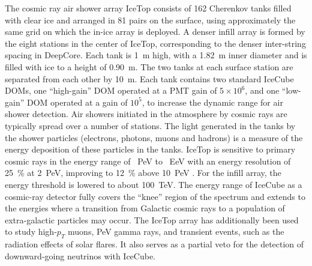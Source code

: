 The cosmic ray air shower array IceTop \cite{ICECUBE:IceTop} consists
of \num{162} Cherenkov tanks filled with clear ice and arranged in
\num{81} pairs on the
surface, using approximately the same grid on which the in-ice
array is deployed. A denser infill array is formed by the eight
stations in the center of IceTop, corresponding to the denser
inter-string spacing
in DeepCore. Each tank is \SI{1}{\meter} high, with a \SI{1.82}{\meter} inner diameter and is
filled with ice to a height of \SI{0.90}{\meter}.  The two tanks at each surface station are separated from
each other by \SI{10}{\meter}. Each tank contains two standard IceCube
DOMs, one ``high-gain'' DOM operated at a PMT gain of $5 \times 10^{6}$, and one
``low-gain'' DOM operated at a gain of $10^{5}$, to increase the dynamic range for air shower detection. Air showers initiated in the atmosphere by cosmic rays are typically
spread over a number of stations. The light generated in the tanks by the
shower particles (electrons, photons, muons and hadrons) is a measure of
the energy deposition of these particles in the tanks. IceTop is sensitive to
primary cosmic rays in the energy range of \SI{}{PeV} to \SI{}{EeV}
with an energy resolution of \SI{25}{\%} at \SI{2}{PeV}, improving to
\SI{12}{\%} above \SI{10}{PeV} \cite{IT:measurement}. For the infill
array, the energy threshold is lowered to about \SI{100}{TeV}. The energy
range of IceCube as a cosmic-ray detector fully covers the ``knee'' region
of the spectrum and extends to the energies where a transition from
Galactic cosmic rays to a population of extra-galactic 
particles may occur. The IceTop array has additionally been used to study
high-$p_T$ muons, PeV gamma rays, and transient events, such as the
radiation effects of solar flares. It also serves as a partial veto for the
detection of downward-going neutrinos with IceCube.   




